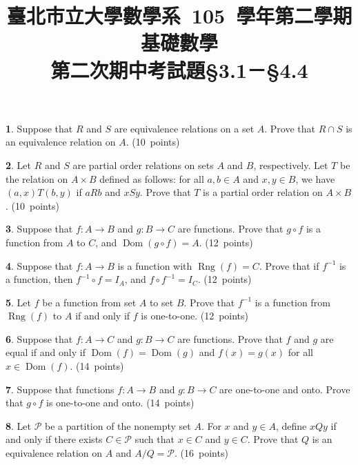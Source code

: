 \documentclass[12pt,a4paper]{article}
\theoremstyle{definition}
\newtheorem{Ex}{}
\DeclareMathOperator{\Dom}{Dom}
\DeclareMathOperator{\Rng}{Rng}
\begin{document}
\title{\CJK%
{\normalsize 臺北市立大學數學系~105~學年第二學期}\\[4pt]
\textbf{基礎數學}\\
{\large 第二次期中考試題}{\small \S3.1－\S4.4}%
}
\author{}
\date{\vspace{-10ex}}
\maketitle

\renewcommand{\baselinestretch}{1.5}
\renewcommand{\labelenumi}{(\arabic{enumi})}
\begin{Ex}
Suppose that $R$ and $S$ are equivalence relations on a set $A$. Prove that $R\cap S$ is an equivalence relation on $A$. \quad (10~points)
\end{Ex}

\begin{Ex}
Let $R$ and $S$ are partial order relations on sets $A$ and $B$, respectively. Let $T$ be the relation on $A\times B$ defined as follows: for all $a,b\in A$ and $x,y\in B$, we have $(a,x)T(b,y)$ if $aRb$ and $xSy$. Prove that $T$ is a partial order relation on $A\times B$. \quad (10~points)
\end{Ex}

\begin{Ex}
Suppose that $f:A\to B$ and $g:B\to C$ are functions. Prove that $g\circ f$ is a function from $A$ to $C$, and $\Dom(g\circ f) = A$. \quad (12~points)
\end{Ex}

\begin{Ex}
Suppose that $f:A\to B$ is a function with $\Rng(f) = C$. Prove that if $f^{-1}$ is a function, then $f^{-1}\circ f = I_A$, and $f\circ f^{-1} = I_C$. \quad (12~points)
\end{Ex}

\begin{Ex}
Let $f$ be a function from set $A$ to set $B$. Prove that $f^{-1}$ is a function from $\Rng(f)$ to $A$ if and only if $f$ is one-to-one. \quad (12~points)
\end{Ex}

\begin{Ex}
Suppose that $f:A\to C$ and $g:B\to C$ are functions. Prove that $f$ and $g$ are equal if and only if $\Dom(f) = \Dom(g)$ and $f(x) = g(x)$ for all $x\in\Dom(f)$. \quad (14~points)
\end{Ex}

\begin{Ex}
Suppose that functions $f:A\to B$ and $g:B\to C$ are one-to-one and onto. Prove that $g\circ f$ is one-to-one and onto. \quad (14~points)
\end{Ex}

\begin{Ex}
Let $\mathcal{P}$ be a partition of the nonempty set $A$. For $x$ and $y\in A$, define $xQy$ if and only if there exists $C\in\mathcal{P}$ such that $x\in C$ and $y\in C$. Prove that $Q$ is an equivalence relation on $A$ and $A/Q = \mathcal{P}$. \quad (16~points)
\end{Ex}
\end{document}
